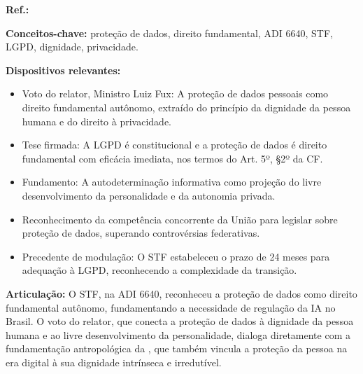 \begin{fichamento}
    \textbf{Ref.:} \cite{STF2020ADI6640}
    
    \textbf{Conceitos-chave:} proteção de dados, direito fundamental, ADI 6640, STF, LGPD, dignidade, privacidade.
    
    \textbf{Dispositivos relevantes:}
    \begin{itemize}
        \item Voto do relator, Ministro Luiz Fux: A proteção de dados pessoais como direito fundamental autônomo, extraído do princípio da dignidade da pessoa humana e do direito à privacidade.
        \item Tese firmada: A LGPD é constitucional e a proteção de dados é direito fundamental com eficácia imediata, nos termos do Art. 5º, §2º da CF.
        \item Fundamento: A autodeterminação informativa como projeção do livre desenvolvimento da personalidade e da autonomia privada.
        \item Reconhecimento da competência concorrente da União para legislar sobre proteção de dados, superando controvérsias federativas.
        \item Precedente de modulação: O STF estabeleceu o prazo de 24 meses para adequação à LGPD, reconhecendo a complexidade da transição.
    \end{itemize}
    
    \textbf{Articulação:} O STF, na ADI 6640, reconheceu a proteção de dados como direito fundamental autônomo, fundamentando a necessidade de regulação da IA no Brasil. O voto do relator, que conecta a proteção de dados à dignidade da pessoa humana e ao livre desenvolvimento da personalidade, dialoga diretamente com a fundamentação antropológica da \MH{}, que também vincula a proteção da pessoa na era digital à sua dignidade intrínseca e irredutível.
\end{fichamento}

